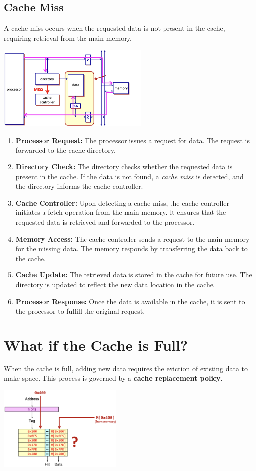 \subsection{Cache Miss}
A cache miss occurs when the requested data is not present in the cache, requiring retrieval from the main memory. 
\begin{center}
    \includegraphics[width=0.55\textwidth]{chapters/chapter3a/images/miss.png}
\end{center}
\begin{enumerate}
    \item \textbf{Processor Request:} The processor issues a request for data. The request is forwarded to the cache directory.
    \item \textbf{Directory Check:} The directory checks whether the requested data is present in the cache. If the data is not found, a \textit{cache miss} is detected, and the directory informs the cache controller.
    \item \textbf{Cache Controller:} Upon detecting a cache miss, the cache controller initiates a fetch operation from the main memory. It ensures that the requested data is retrieved and forwarded to the processor.
    \item \textbf{Memory Access:} The cache controller sends a request to the main memory for the missing data. The memory responds by transferring the data back to the cache.
    \item \textbf{Cache Update:} The retrieved data is stored in the cache for future use. The directory is updated to reflect the new data location in the cache.
    \item \textbf{Processor Response:} Once the data is available in the cache, it is sent to the processor to fulfill the original request.
\end{enumerate}

\section{What if the Cache is Full?}
When the cache is full, adding new data requires the eviction of existing data to make space. This process is governed by a \textbf{cache replacement policy}. 
\begin{center}
    \includegraphics[width=0.45\textwidth]{chapters/chapter3a/images/full.png}
\end{center}
